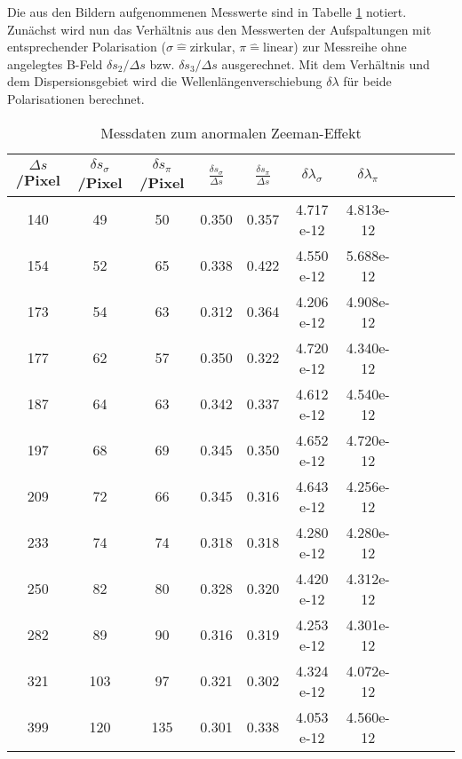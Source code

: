 Die aus den Bildern aufgenommenen Messwerte sind in Tabelle \ref{tab:blau} notiert.
Zunächst wird nun das Verhältnis aus den Messwerten der Aufspaltungen mit entsprechender Polarisation ($\sigma \widehat{=} \text{zirkular}$, $\pi \widehat{=} \text{linear}$) zur Messreihe ohne angelegtes B-Feld $\delta s_{2}/\Delta s$ bzw. $\delta s_{3}/ \Delta s$ ausgerechnet.
Mit dem Verhältnis und dem Dispersionsgebiet wird die Wellenlängenverschiebung $\delta \lambda$ für beide Polarisationen berechnet.
%
%
\begin{table}[h!]
  \centering
  \caption{Messdaten zum anormalen Zeeman-Effekt}
  \label{tab:blau}
  \begin{tabular}{c c c c c c c c c c c}
    \toprule

      $\Delta s$/Pixel & $\delta s_{\sigma}$/Pixel & $\delta s_{\pi}$/Pixel & $\frac{\delta s_{\sigma}}{\Delta s}$ & $\frac{\delta s_{\pi}}{\Delta s}$  & $ \delta \lambda_{\sigma} $ &  $\delta \lambda_{\pi}$    \\
      \midrule
      140   &   49    &   50    &   0.350   &     0.357     &   4.717 e-12   & 4.813e-12  \\
      154   &   52    &   65    &   0.338   &     0.422     &   4.550 e-12   & 5.688e-12  \\
      173   &   54    &   63    &   0.312   &     0.364     &   4.206 e-12   & 4.908e-12  \\
      177   &   62    &   57    &   0.350   &     0.322     &   4.720 e-12   & 4.340e-12  \\
      187   &   64    &   63    &   0.342   &     0.337     &   4.612 e-12   & 4.540e-12  \\
      197   &   68    &   69    &   0.345   &     0.350     &   4.652 e-12   & 4.720e-12  \\
      209   &   72    &   66    &   0.345   &     0.316     &   4.643 e-12   & 4.256e-12  \\
      233   &   74    &   74    &   0.318   &     0.318     &   4.280 e-12   & 4.280e-12  \\
      250   &   82    &   80    &   0.328   &     0.320     &   4.420 e-12   & 4.312e-12  \\
      282   &   89    &   90    &   0.316   &     0.319     &   4.253 e-12   & 4.301e-12  \\
      321   &   103   &   97    &   0.321   &     0.302     &   4.324 e-12   & 4.072e-12  \\
      399   &   120   &   135   &   0.301   &     0.338     &   4.053 e-12   & 4.560e-12  \\
    \bottomrule
  \end{tabular}
\end{table}
